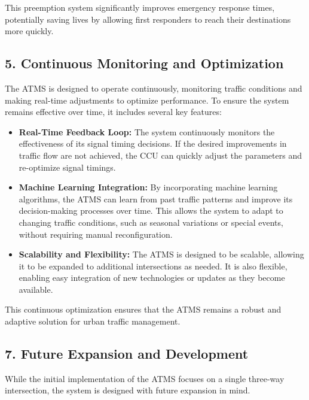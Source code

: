 \documentclass{scrreprt}
\begin{document}
This preemption system significantly improves emergency response times, potentially saving lives by allowing first responders to reach their destinations more quickly.

\subsection*{5. Continuous Monitoring and Optimization}

The ATMS is designed to operate continuously, monitoring traffic conditions and making real-time adjustments to optimize performance. To ensure the system remains effective over time, it includes several key features:

\begin{itemize}
    \item \textbf{Real-Time Feedback Loop:} 
    The system continuously monitors the effectiveness of its signal timing decisions. If the desired improvements in traffic flow are not achieved, the CCU can quickly adjust the parameters and re-optimize signal timings.

    \item \textbf{Machine Learning Integration:} 
    By incorporating machine learning algorithms, the ATMS can learn from past traffic patterns and improve its decision-making processes over time. This allows the system to adapt to changing traffic conditions, such as seasonal variations or special events, without requiring manual reconfiguration.

    \item \textbf{Scalability and Flexibility:} 
    The ATMS is designed to be scalable, allowing it to be expanded to additional intersections as needed. It is also flexible, enabling easy integration of new technologies or updates as they become available.
\end{itemize}

This continuous optimization ensures that the ATMS remains a robust and adaptive solution for urban traffic management.

\subsection*{7. Future Expansion and Development}

While the initial implementation of the ATMS focuses on a single three-way intersection, the system is designed with future expansion in mind.
\end{document}
